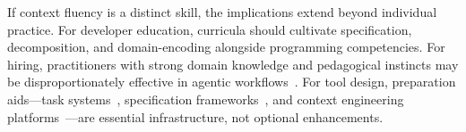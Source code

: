 If context fluency is a distinct skill, the implications extend
beyond individual practice. For developer education, curricula should
cultivate specification, decomposition, and domain-encoding alongside
programming competencies. For hiring, practitioners with strong
domain knowledge and pedagogical instincts may be disproportionately
effective in agentic workflows~\cite{dakhel2025humanai}. For tool
design, preparation aids---task systems~\cite{yegge2025beads,
emanuel2025beadsrust}, specification frameworks~\cite{github2025speckit},
and context engineering platforms~\cite{anthropic2025context}---are
essential infrastructure, not optional enhancements.
